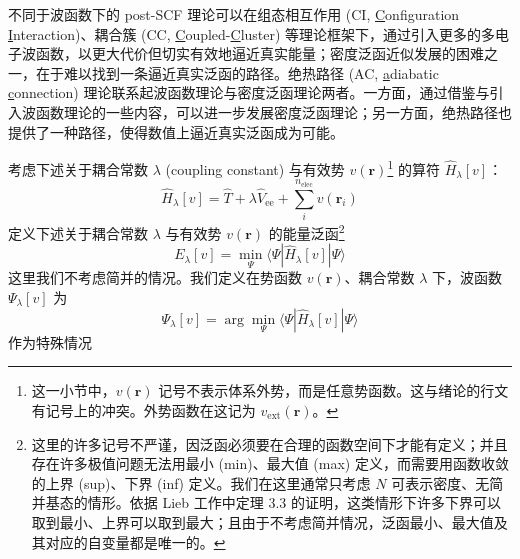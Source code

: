 不同于波函数下的 post-SCF 理论可以在组态相互作用 (CI, \underline{C}onfiguration \underline{I}nteraction)、耦合簇 (CC, \underline{C}oupled-\underline{C}luster) 等理论框架下，通过引入更多的多电子波函数，以更大代价但切实有效地逼近真实能量；密度泛函近似发展的困难之一，在于难以找到一条逼近真实泛函的路径。绝热路径 (AC, \underline{a}diabatic \underline{c}onnection) 理论联系起波函数理论与密度泛函理论两者。一方面，通过借鉴与引入波函数理论的一些内容，可以进一步发展密度泛函理论；另一方面，绝热路径也提供了一种路径，使得数值上逼近真实泛函成为可能。

考虑下述关于耦合常数 $\lambda$ (coupling constant) 与有效势 $v(\bm{r})$\footnote{这一小节中，$v(\bm{r})$ 记号不表示体系外势，而是任意势函数。这与绪论的行文有记号上的冲突。外势函数在这记为 $v_\mathrm{ext} (\bm{r})$。} 的算符 $\hat H_\lambda [v]$： 
\begin{equation}
  \hat H_\lambda [v] = \hat T + \lambda \hat V_\mathrm{ee} + \sum_i^{n_\mathrm{elec}} v(\bm{r}_i)
\end{equation}
定义下述关于耦合常数 $\lambda$ 与有效势 $v(\bm{r})$ 的能量泛函\footnote{这里的许多记号不严谨，因泛函必须要在合理的函数空间下才能有定义；并且存在许多极值问题无法用最小 (min)、最大值 (max) 定义，而需要用函数收敛的上界 (sup)、下界 (inf) 定义。我们在这里通常只考虑 $N$ 可表示密度、无简并基态的情形。依据 Lieb 工作\cite{Lieb-Lieb.IJQC.1983}中定理 3.3 的证明，这类情形下许多下界可以取到最小、上界可以取到最大；且由于不考虑简并情况，泛函最小、最大值及其对应的自变量都是唯一的。}
\begin{equation}
  \label{eq.E-lambda}
  E_\lambda [v] = \min_{\Psi} \langle \Psi | \hat H_\lambda [v] | \Psi \rangle 
\end{equation}
这里我们不考虑简并的情况。我们定义在势函数 $v(\bm{r})$、耦合常数 $\lambda$ 下，波函数 $\Psi_\lambda [v]$ 为
\begin{equation}
  \label{eq.E-lambda-psi}
  \Psi_\lambda [v] = \arg \min_{\Psi} \langle \Psi | \hat H_\lambda [v] | \Psi \rangle
\end{equation}
作为特殊情况
